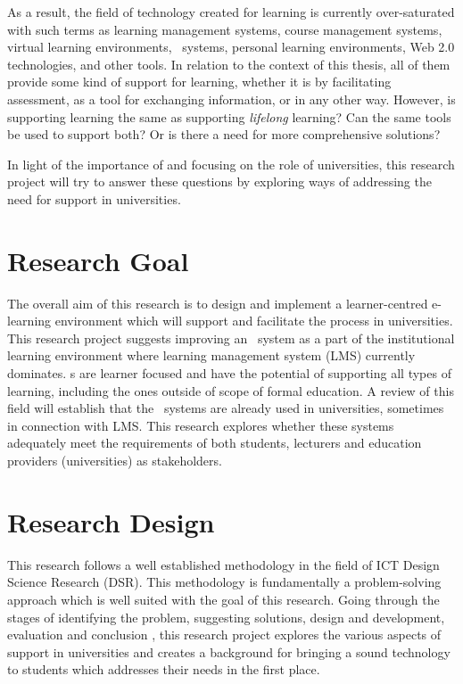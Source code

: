 As a result, the field of technology created for learning is currently
over-saturated with such terms as learning management systems, course management
systems, virtual learning environments, \ep~systems, personal learning
environments, Web 2.0 technologies, and other tools. In relation to the context
of this thesis, all of them provide some kind of support for learning, whether
it is by facilitating assessment, as a tool for exchanging information, or in
any other way. However, is supporting learning the same as supporting
\textit{lifelong} learning? Can the same tools be used to support both? Or is
there a need for more comprehensive solutions?

In light of the importance of \LLLs and focusing on the role of universities,
this research project will try to answer these questions by exploring ways
of addressing the need for \LLLs support in universities.

\section{Research Goal}

The overall aim of this research is to design and implement a learner-centred
e-learning environment which will support and facilitate the \LLLs process in
universities. This research project suggests improving an \ep~system as a part
of the institutional learning environment where learning management system (LMS)
currently dominates. \ep s are learner focused and have the potential of
supporting all types of learning, including the ones outside of scope of formal
education. A review of this field will establish that the \ep~systems are
already used in universities, sometimes in connection with LMS. This research
explores whether these systems adequately meet the requirements of both
students, lecturers and education providers (universities) as \LLLs
stakeholders.

\section{Research Design}

This research follows a well established methodology in the field of ICT Design
Science Research (DSR). This methodology is fundamentally a problem-solving
approach \citep{Cross1993} which is well suited with the goal of this research.
Going through the stages of identifying the problem, suggesting solutions,
design and development, evaluation and conclusion
\citep{Peffers2008,Vaishnavi2007}, this research project explores the various
aspects of \LLLs support in universities and creates a background for bringing a
sound technology to students which addresses their needs in the first place.

